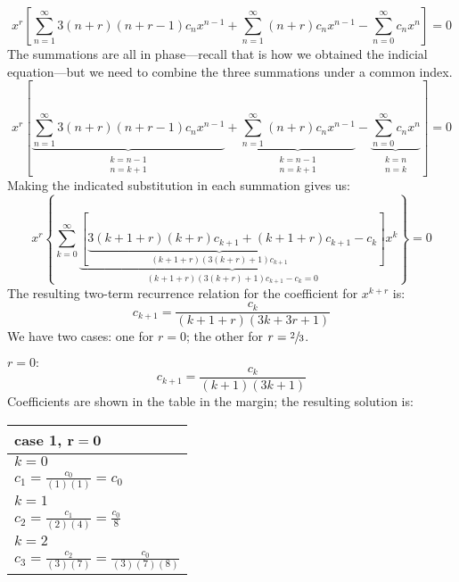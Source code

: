 \begin{equation*}
x^r \left[\sum\limits_{n=1}^{\infty} 3(n+r)(n+r-1)c_nx^{n-1} + \sum\limits_{n=1}^{\infty} (n+r)c_nx^{n-1} - \sum\limits_{n=0}^{\infty}c_nx^n \right] = 0
\end{equation*}
The summations are all in phase---recall that is how we obtained the indicial equation---but we need to combine the three summations under a common index.
\begin{equation*}
x^r \left[\underbrace{\sum\limits_{n=1}^{\infty} 3(n+r)(n+r-1)c_nx^{n-1}}_{\substack{k=n-1 \\ n=k+1}} + \underbrace{\sum\limits_{n=1}^{\infty} (n+r)c_nx^{n-1}}_{\substack{k=n-1 \\ n=k+1}} - \underbrace{\sum\limits_{n=0}^{\infty}c_nx^n}_{\substack{k=n \\n=k}} \right] = 0
\end{equation*}
Making the indicated substitution in each summation gives us:
\begin{equation*}
x^r\left\{\sum\limits_{k=0}^{\infty} \underbrace{\left[\underbrace{3(k+1+r)(k+r)c_{k+1}+(k+1+r)c_{k+1}}_{(k+1+r)(3(k+r)+1)c_{k+1}} - c_k\right]}_{(k+1+r)(3(k+r)+1)c_{k+1} - c_k = 0}x^k\right\} = 0
\end{equation*}
The resulting two-term recurrence relation for the coefficient for $x^{k+r}$ is:
\begin{equation*}
c_{k+1}=\frac{c_k}{(k+1+r)(3k+3r+1)}
\end{equation*}
We have two cases: one for $r=0$; the other for $r = \sfrac{2}{3}$.

\vspace{0.25cm}
\noindent$r=0:$
\begin{equation*}
c_{k+1} = \frac{c_k}{(k+1)(3k+1)}
\end{equation*}
\noindent Coefficients are shown in the table in the margin; the resulting solution is:
\begin{margintable}
\begin{tabular}{|l|} 
\hline
\textbf{case 1, } $\mathbf{r = 0}$ \\\hline
$k = 0$ \\
$c_1 = \frac{c_0}{(1)(1)} = c_0$ \\\hline
$k = 1$ \\
$c_2 = \frac{c_1}{(2)(4)} = \frac{c_0}{8}$ \\\hline
$k=2$ \\
$c_3 = \frac{c_2}{(3)(7)} = \frac{c_0}{(3)(7)(8)}$\\\hline
\end{tabular}
\end{margintable}

